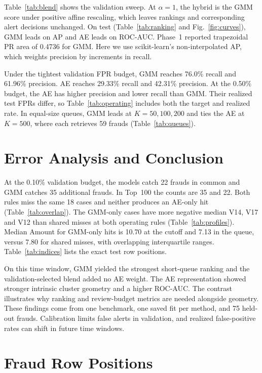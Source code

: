 \documentclass[conference]{IEEEtran}
\begin{document}
Table~\ref{tab:blend} shows the validation sweep. At $\alpha=1$, the hybrid is the GMM score under positive affine rescaling, which leaves rankings and corresponding alert decisions unchanged. On test (Table~\ref{tab:ranking} and Fig.~\ref{fig:curves}), GMM leads on AP and AE leads on ROC-AUC. Phase~1 reported trapezoidal PR area of 0.4736 for GMM. Here we use scikit-learn's non-interpolated AP, which weights precision by increments in recall.



Under the tightest validation FPR budget, GMM reaches 76.0\% recall and 61.96\% precision. AE reaches 29.33\% recall and 42.31\% precision. At the 0.50\% budget, the AE has higher precision and lower recall than GMM. Their realized test FPRs differ, so Table~\ref{tab:operating} includes both the target and realized rate. In equal-size queues, GMM leads at $K=50,100,200$ and ties the AE at $K=500$, where each retrieves 59 frauds (Table~\ref{tab:queues}).



\section{Error Analysis and Conclusion}
At the 0.10\% validation budget, the models catch 22 frauds in common and GMM catches 35 additional frauds. In Top~100 the counts are 35 and 22. Both rules miss the same 18 cases and neither produces an AE-only hit (Table~\ref{tab:overlap}). The GMM-only cases have more negative median V14, V17 and V12 than shared misses at both operating rules (Table~\ref{tab:profiles}). Median Amount for GMM-only hits is 10.70 at the cutoff and 7.13 in the queue, versus 7.80 for shared misses, with overlapping interquartile ranges. Table~\ref{tab:indices} lists the exact test row positions.



On this time window, GMM yielded the strongest short-queue ranking and the validation-selected blend added no AE weight. The AE representation showed stronger intrinsic cluster geometry and a higher ROC-AUC. The contrast illustrates why ranking and review-budget metrics are needed alongside geometry. These findings come from one benchmark, one saved fit per method, and 75 held-out frauds. Calibration limits false alerts in validation, and realized false-positive rates can shift in future time windows.

\appendix
\section*{Fraud Row Positions}

\end{document}
